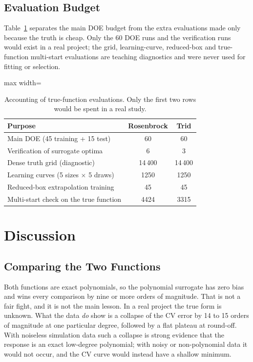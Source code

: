 \subsection{Evaluation Budget}

Table~\ref{tab:budget} separates the main DOE budget from the extra evaluations made only because the truth is cheap. Only the 60 DOE runs and the verification runs would exist in a real project; the grid, learning-curve, reduced-box and true-function multi-start evaluations are teaching diagnostics and were never used for fitting or selection.

\begin{table}[!htbp]
  \centering
  \caption{Accounting of true-function evaluations. Only the first two rows would be spent in a real study.}
  \label{tab:budget}
  \begin{adjustbox}{max width=\linewidth}
  \begin{tabular}{lcc}
    \toprule
    Purpose & Rosenbrock & Trid \\
    \midrule
    Main DOE (45 training + 15 test) & 60 & 60 \\
    Verification of surrogate optima & 6 & 3 \\
    \midrule
    Dense truth grid (diagnostic) & 14\,400 & 14\,400 \\
    Learning curves (5 sizes $\times$ 5 draws) & 1250 & 1250 \\
    Reduced-box extrapolation training & 45 & 45 \\
    Multi-start check on the true function & 4424 & 3315 \\
    \bottomrule
  \end{tabular}
  \end{adjustbox}
\end{table}

\section{Discussion}\label{sec:discussion}

\subsection{Comparing the Two Functions}

Both functions are exact polynomials, so the polynomial surrogate has zero bias and wins every comparison by nine or more orders of magnitude. That is not a fair fight, and it is not the main lesson. In a real project the true form is unknown. What the data \emph{do} show is a collapse of the CV error by 14 to 15 orders of magnitude at one particular degree, followed by a flat plateau at round-off. With noiseless simulation data such a collapse is strong evidence that the response is an exact low-degree polynomial; with noisy or non-polynomial data it would not occur, and the CV curve would instead have a shallow minimum.


